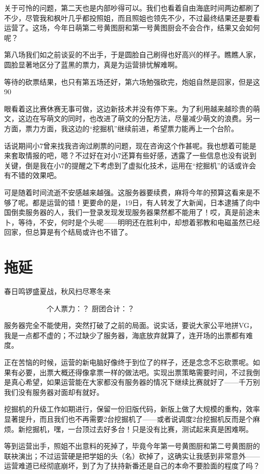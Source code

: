 关于可怜的问题，第二天也是内部吵得可以。我们也看着自由海底时间两边都刷了不少，尽管我和枫叶几乎都投照姐，而且照姐也领先不少，不过最终结果还是要看运营了。这场，今年日萌第二号黄图厨和第一号黄图厨会不会合作，结果又会如何呢？

第八场我们如之前谈妥的不出手，于是圆脸自己刷得也好高兴的样子。瞧瞧人家，圆脸显著地区分了蓝黑的票力，真是为运营排忧解难啊。

等待的砍票结果，也只有第五场还好，第六场勉强砍完，炮姐自然是回家，但是这90%

眼看着这比赛休赛无事可做，这边新技术并没有停下来。为了利用越来越珍贵的萌文，这边在写萌文的同时，也改进了萌文的分配方法，尽量减少萌文的浪费。另一方面，票力方面，我这边的“挖掘机”继续前进，希望票力能再上一个台阶。

话说期间小7曾来找我咨询过刷票的问题，现在咨询这个作甚呢。我也想着可能是来套取情报的吧，嗯？不过好在对小7还算有些好感，透露了一些信息也没有说到关键，倒是我在小7的提醒之下考虑到了虚拟化技术，运用在“挖掘机”的话或许会有不错的效果吧。

可是随着时间流逝不安感越来越强。这服务器要续费，麻将今年的预算这看来是不够了呢。都是运营的错！更要命的是，19日，有人转发了大新闻，日本逮捕了向中国倒卖服务器的人，我们一登录发现发现服务器果然都不能用了！哎，真是前途未卜，等待，不安，何时是个头呢——明明还在胜利中，却想着邪教和电磁虽然已经回家，但总算是有个结局或许也不错了。


\section{拖延}
春日鸣锣盛夏战，秋风扫尽寒冬来

　　　　　　个人票力：？ 厨团合计：？

服务器完全不能使用，突然打破了之前的局面。说实话，要说大家公平地拼VG，我是一点都不虚的；不过缺少了服务器，海底放弃就算了，连开场的出票都有难度。

正在苦恼的时候，运营的新电脑好像终于到位了的样子，还是念念不忘砍票呢。如果有必要，出票大概还得像拿票一样的做法吧。实现出票策略需要时间，不过我倒是真心希望，如果运营能在大家都没有服务器的情况下继续比赛就好了——千万别我们没有服务器对面却有就好。

挖掘机的升级工作如期进行，保留一份旧版代码，新版上做了大规模的重构，效率显著提升，而且我们也不再需要2台挖掘机了——或者说调度2台挖掘机反而是个麻烦。新挖掘机，嘿，一台顶过去好多台！只是没有比赛，测试起来真是困难啊。

等到运营出手，照姐不出意料的死掉了，毕竟今年第一号黄图厨和第二号黄图厨的联袂演出；不过运营硬是把学姐的头（名）砍掉了，这确实让我感到非常意外——运营难道已经彻底崩坏，到了为了扶持新番还是自己的本命不要脸面的程度了吗？

